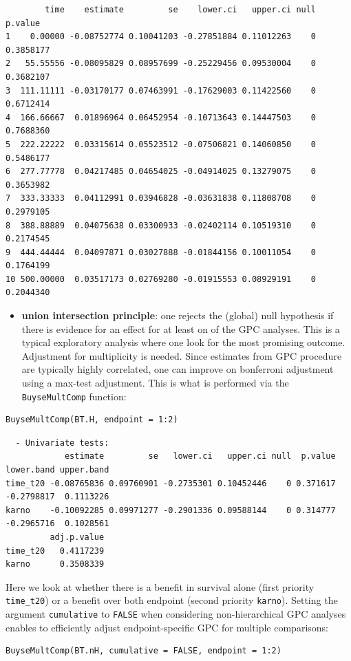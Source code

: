 \documentclass[12pt]{article}
\begin{document}
\begin{verbatim}
        time    estimate         se    lower.ci   upper.ci null   p.value
1    0.00000 -0.08752774 0.10041203 -0.27851884 0.11012263    0 0.3858177
2   55.55556 -0.08095829 0.08957699 -0.25229456 0.09530004    0 0.3682107
3  111.11111 -0.03170177 0.07463991 -0.17629003 0.11422560    0 0.6712414
4  166.66667  0.01896964 0.06452954 -0.10713643 0.14447503    0 0.7688360
5  222.22222  0.03315614 0.05523512 -0.07506821 0.14060850    0 0.5486177
6  277.77778  0.04217485 0.04654025 -0.04914025 0.13279075    0 0.3653982
7  333.33333  0.04112991 0.03946828 -0.03631838 0.11808708    0 0.2979105
8  388.88889  0.04075638 0.03300933 -0.02402114 0.10519310    0 0.2174545
9  444.44444  0.04097871 0.03027888 -0.01844156 0.10011054    0 0.1764199
10 500.00000  0.03517173 0.02769280 -0.01915553 0.08929191    0 0.2044340
\end{verbatim}
\begin{itemize}
\item \textbf{union intersection principle}: one rejects the (global) null
hypothesis if there is evidence for an effect for at least on of the
GPC analyses. This is a typical exploratory analysis where one look
for the most promising outcome. Adjustment for multiplicity is
needed.  Since estimates from GPC procedure are typically highly
correlated, one can improve on bonferroni adjustment using a
max-test adjustment. This is what is performed via the
\texttt{BuyseMultComp} function:
\end{itemize}
\lstset{language=r,label= ,caption= ,captionpos=b,numbers=none}
\begin{lstlisting}
BuyseMultComp(BT.H, endpoint = 1:2)
\end{lstlisting}

\begin{verbatim}
  - Univariate tests:
            estimate         se   lower.ci   upper.ci null  p.value lower.band upper.band
time_t20 -0.08765836 0.09760901 -0.2735301 0.10452446    0 0.371617 -0.2798817  0.1113226
karno    -0.10092285 0.09971277 -0.2901336 0.09588144    0 0.314777 -0.2965716  0.1028561
         adj.p.value
time_t20   0.4117239
karno      0.3508339
\end{verbatim}


Here we look at whether there is a benefit in survival alone (first
priority \texttt{time\_t20}) or a benefit over both endpoint (second priority
\texttt{karno}). Setting the argument \texttt{cumulative} to \texttt{FALSE} when
considering non-hierarchical GPC analyses enables to efficiently
adjust endpoint-specific GPC for multiple comparisons:
\lstset{language=r,label= ,caption= ,captionpos=b,numbers=none}
\begin{lstlisting}
BuyseMultComp(BT.nH, cumulative = FALSE, endpoint = 1:2)
\end{lstlisting}
\end{document}
